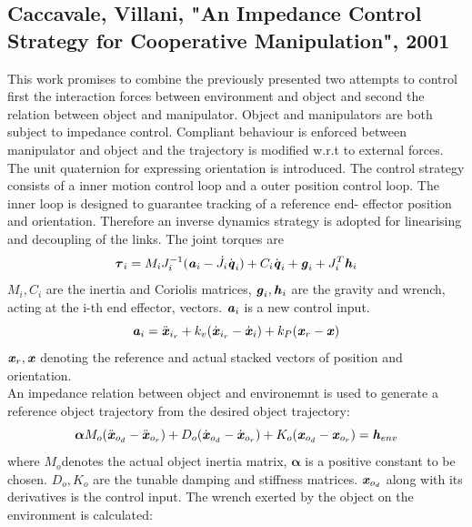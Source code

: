 \documentclass[conference]{IEEEtran}
\begin{document}

\subsection{Caccavale, Villani, "An Impedance Control Strategy for Cooperative Manipulation", 2001}
This work promises to  combine the previously presented  two attempts to control first the interaction forces between environment and object and second the relation between object and manipulator. Object and manipulators are both subject to impedance control. Compliant behaviour is enforced between manipulator and object and the trajectory is modified w.r.t to external forces. The unit quaternion for expressing orientation is introduced. The control strategy consists of a inner motion control loop and a outer position control loop. The inner loop is designed to guarantee tracking of a reference end- effector position and orientation. Therefore an inverse dynamics strategy is adopted for linearising and decoupling of the links. The joint torques are
\begin{equation}
\boldsymbol{\tau}_i = M_i  J_i^{-1} ( \textbf{\textit{a}}_i - \dot{J}_i\dot{\textbf{\textit{q}}}_i) + C_i\dot{\textbf{\textit{q}}}_i + \textbf{\textit{g}}_i +  J_i^T\textbf{\textit{h}}_i
\end{equation}
$ M_i,C_i $ are the inertia and Coriolis matrices, $ \textbf{\textit{g}}_i,\textbf{\textit{h}}_i $ are the gravity and wrench, acting at the i-th end effector, vectors.
$ \textbf{\textit{a}}_i $ is a new control input.
\begin{equation}
\textbf{\textit{a}}_i = \ddot{\textbf{\textit{x}}}_{i_r} + k_v(\dot{\textbf{\textit{x}}}_{i_r} - \dot{\textbf{\textit{x}}}_{i}) + k_P(\textbf{\textit{x}}_r - \textbf{\textit{x}})
\end{equation}
$ \textbf{\textit{x}}_r,\textbf{\textit{x}} $ denoting the reference and actual stacked vectors of position and orientation. \\
An impedance relation between object and environemnt is used to generate a reference object trajectory from the desired object trajectory:
\begin{equation}
\boldsymbol{\alpha}M_o(\ddot{\textbf{\textit{x}}}_{o_d} - \ddot{\textbf{\textit{x}}}_{o_r})  + D_o(\dot{\textbf{\textit{x}}}_{o_d} - \dot{\textbf{\textit{x}}}_{o_r}) + K_o(\textbf{\textit{x}}_{o_d} - \textbf{\textit{x}}_{o_r})  = \textbf{\textit{h}}_{env}
\end{equation}
where $ M_o $denotes the actual object inertia matrix, $ \boldsymbol{\alpha} $ is a positive constant to be chosen. $ D_o, K_o $ are the tunable damping and stiffness matrices. $ \textbf{\textit{x}}_{o_d} $ along with its derivatives is the control input. The wrench exerted by the object on the environment is calculated:
\end{document}

